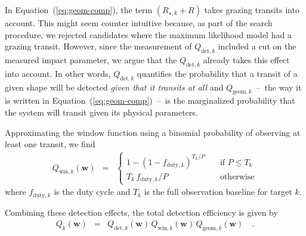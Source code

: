 \documentclass[manuscript, letterpaper]{aastex6}
\renewcommand{\eqref}[1]{\ref{eq:#1}}
\newcommand{\Eq}[1]{Equation~(\eqref{#1})}
\newcommand{\eq}[1]{\Eq{#1}}
\newcommand{\bvec}[1]{{\ensuremath{\boldsymbol{#1}}}}
\newcommand{\response}[1]{{\color{blue}#1}}
\newcommand{\params}{{\ensuremath{\bvec{w}}}}
\begin{document}
\response{%
In \eq{geom-comp}, the term $(R_{\star,k}+R)$ takes grazing transits into
account.
This might seem counter intuitive because, as part of the search procedure, we
rejected candidates where the maximum likelihood model had a grazing transit.
However, since the measurement of $Q_{\mathrm{det},k}$ included a cut on the
measured impact parameter, we argue that the $Q_{\mathrm{det},k}$ already
takes this effect into account.
In other words, $Q_{\mathrm{det},k}$ quantifies the probability that a transit
of a given shape will be detected \emph{given that it transits at all} and
$Q_{\mathrm{geom},k}$~--~the way it is written in \eq{geom-comp}~--~is the
marginalized probability that the system will transit given its physical
parameters.
}

Approximating the window function using a binomial probability of observing
at least one transit, we find \citep[following][]{Burke:2014a}
\begin{eqnarray}
Q_{\mathrm{win},k} (\params) &=& \left\{\begin{array}{ll}
1 - (1 - f_{\mathrm{duty},k})^{T_k/P} & \quad\mbox{if $P \le T_k$} \\
T_k\,f_{\mathrm{duty},k} / P & \quad\mbox{otherwise}
\end{array}\right.
\end{eqnarray}
where $f_{\mathrm{duty},k}$ is the duty cycle and $T_k$ is the full
observation baseline for target $k$.

Combining these detection effects, the total detection efficiency is given by
\begin{eqnarray}
Q_k(\params) &=& Q_{\mathrm{det},k}(\params) \,
                 Q_{\mathrm{win},k} (\params) \,
                 Q_{\mathrm{geom},k} (\params) \quad.
\end{eqnarray}
\end{document}
